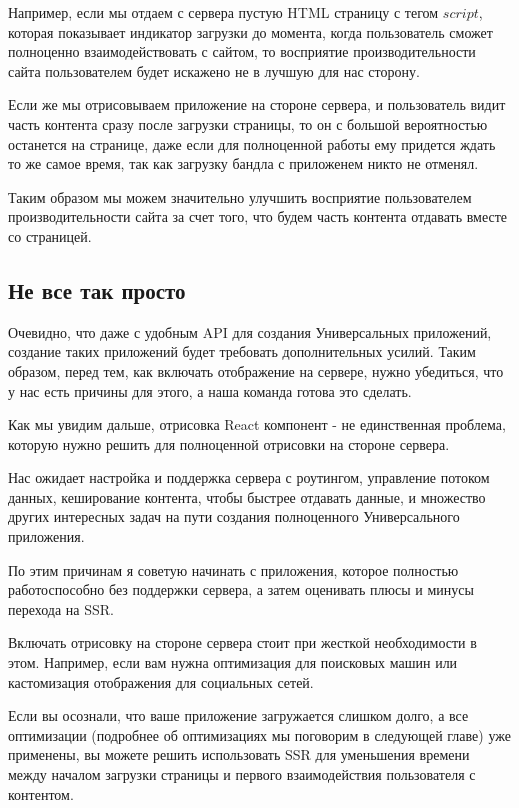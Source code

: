 Например, если мы отдаем с сервера пустую HTML страницу с тегом $script$, которая показывает индикатор загрузки до момента, когда пользователь сможет полноценно взаимодействовать с сайтом, то восприятие производительности сайта пользователем будет искажено не в лучшую для нас сторону.

Если же мы отрисовываем приложение на стороне сервера, и пользователь видит часть контента сразу после загрузки страницы, то он с большой вероятностью останется на странице, даже если для полноценной работы ему придется ждать то же самое время, так как загрузку бандла с приложенем никто не отменял.

Таким образом мы можем значительно улучшить восприятие пользователем производительности сайта за счет того, что будем часть контента отдавать вместе со страницей.

\subsection{Не все так просто}

Очевидно, что даже с удобным API для создания Универсальных приложений, создание таких приложений будет требовать дополнительных усилий. Таким образом, перед тем, как включать отображение на сервере, нужно убедиться, что у нас есть причины для этого, а наша команда готова это сделать.

Как мы увидим дальше, отрисовка React компонент - не единственная проблема, которую нужно решить для полноценной отрисовки на стороне сервера.

Нас ожидает настройка и поддержка сервера с роутингом, управление потоком данных, кеширование контента, чтобы быстрее отдавать данные, и множество других интересных задач на пути создания полноценного Универсального приложения.

По этим причинам я советую начинать с приложения, которое полностью работоспособно без поддержки сервера, а затем оценивать плюсы и минусы перехода на SSR.

Включать отрисовку на стороне сервера стоит при жесткой необходимости в этом. Например, если вам нужна оптимизация для поисковых машин или кастомизация отображения для социальных сетей.

Если вы осознали, что ваше приложение загружается слишком долго, а все оптимизации (подробнее об оптимизациях мы поговорим в следующей главе) уже применены, вы можете решить использовать SSR для уменьшения времени между началом загрузки страницы и первого взаимодействия пользователя с контентом. 

